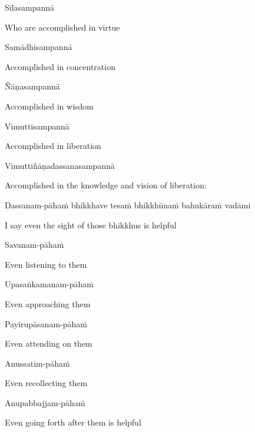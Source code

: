 Sīlasampannā

\begin{cprenglish}
  Who are accomplished in virtue
\end{cprenglish}

Samādhisampannā

\begin{cprenglish}
  Accomplished in concentration
\end{cprenglish}

Ñāṇasampannā

\begin{cprenglish}
  Accomplished in wisdom
\end{cprenglish}

Vimuttisampannā

\begin{cprenglish}
  Accomplished in liberation
\end{cprenglish}

Vimuttiñāṇadassanasampannā

\begin{cprenglish}
  Accomplished in the knowledge and vision of liberation:
\end{cprenglish}

Dassanam-pāhaṁ bhikkhave tesaṁ bhikkhūnaṁ bahukāraṁ vadāmi

\begin{cprenglish}
  I say even the sight of those bhikkhus is helpful
\end{cprenglish}

Savanam-pāhaṁ

\begin{cprenglish}
  Even listening to them
\end{cprenglish}

Upasaṅkamanam-pāhaṁ

\begin{cprenglish}
  Even approaching them
\end{cprenglish}

Payirupāsanam-pāhaṁ

\begin{cprenglish}
  Even attending on them
\end{cprenglish}

Anussatim-pāhaṁ

\begin{cprenglish}
  Even recollecting them
\end{cprenglish}

Anupabbajjam-pāhaṁ

\begin{cprenglish}
  Even going forth after them is helpful
\end{cprenglish}

